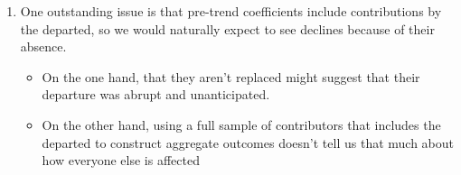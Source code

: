 \begin{enumerate}
\begin{itemize}
    \end{itemize}
    \item One outstanding issue is that  pre-trend coefficients include contributions by the departed, so we would naturally expect to see declines because of their absence. \begin{itemize}
        \item On the one hand, that they aren't replaced might suggest that their departure was abrupt and unanticipated. 
        \item On the other hand, using a full sample of contributors that includes the departed to construct aggregate outcomes doesn't tell us that much about how everyone else is affected 
    \end{itemize}
\end{enumerate}

